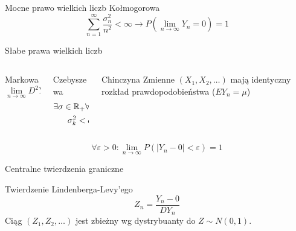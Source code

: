 \documentclass{mp}
\begin{document}
\begin{frame}{Mocne prawo wielkich liczb Kołmogorowa}
\[ \sum_{n=1}^\infty \frac{\sigma_n^2}{n^2}<\infty \to P(\lim_{n\to\infty} Y_n=0)=1 \]
\end{frame}
\begin{frame}{Słabe prawa wielkich liczb}
\begin{columns}[T]
\begin{column}{.30\textwidth}
{
\begin{block}{Markowa}
\[\lim_{n\to\infty} D^2Y_n=0 \]
\end{block}
}
\end{column}
\begin{column}{.30\textwidth}
{
\begin{block}{Czebyszewa}
\begin{gather*}
\exists \sigma\in\mathbb{R}_{+}\forall k\in\mathbb{N} \\
\sigma_k^2<\sigma^2
\end{gather*}
\end{block}
}
\end{column}
\begin{column}{.30\textwidth}
{
\begin{block}{Chinczyna}
Zmienne $(X_1, X_2, \ldots)$ mają identyczny rozkład prawdopodobieństwa
($EY_n=\mu$)
\end{block}
}
\end{column}
\end{columns}
\begin{block}{}
\[ \forall \varepsilon>0\colon \lim_{n\to\infty} P(\left|Y_n-0\right|<\varepsilon)=1 \]
\end{block}
\end{frame}
\begin{frame}{Centralne twierdzenia graniczne}
\begin{block}{Twierdzenie Lindenberga-Levy'ego}
\[ Z_n=\frac{Y_n-0}{DY_n} \]
Ciąg $(Z_1,Z_2,\ldots)$ jest zbieżny wg dystrybuanty do $Z\sim N(0,1)$.
\end{block}
\end{frame}
\end{document}
